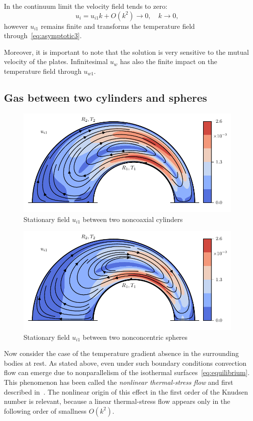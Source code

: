 \documentclass[smallextended, referee]{svjour3} %
\begin{document}
In the continuum limit the velocity field tends to zero:
\[ u_i = u_{i1}k + O(k^2) \to 0, \quad k\to0, \]
however \(u_{i1}\) remains finite and transforms the temperature field through~\eqref{eq:asymptotic3}.

Moreover, it is important to note that the solution is very sensitive to the mutual velocity of the plates.
Infinitesimal \(u_w\) has also the finite impact on the temperature field through \(u_{w1}\).

\subsection{Gas between two cylinders and spheres}

\begin{figure}
	\centering
	\includegraphics{Fig7}
	\caption{Stationary field \(u_{i1}\) between two noncoaxial cylinders}\label{fig:cylinders}
\end{figure}

\begin{figure}
	\centering
	\includegraphics{Fig8}
	\caption{Stationary field \(u_{i1}\) between two nonconcentric spheres}\label{fig:spheres}
\end{figure}

Now consider the case of the temperature gradient absence in the surrounding bodies at rest.
As stated above, even under such boundary conditions convection flow can emerge
due to nonparallelism of the isothermal surfaces~\eqref{eq:equilibrium}.
This phenomenon has been called the \textit{nonlinear thermal-stress flow} and first described in~\cite{Kogan1971}.
The nonlinear origin of this effect in the first order of the Knudsen number is relevant,
because a linear thermal-stress flow appears only in the following order of smallness \(O(k^2)\).
\end{document}
